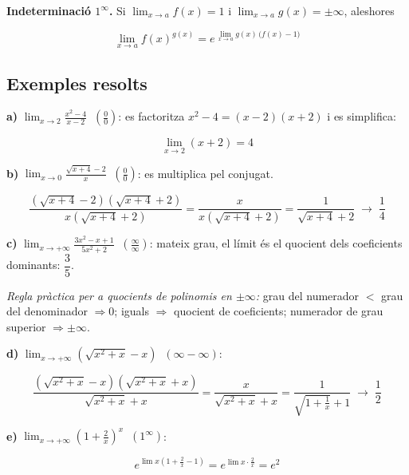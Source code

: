 \textbf{Indeterminació $1^\infty$.} Si $\displaystyle\lim_{x\to a} f(x)=1$ i $\displaystyle\lim_{x\to a} g(x)=\pm\infty$, aleshores

\begin{equation*}
\lim_{x\to a} f(x)^{g(x)} = e^{\,\lim_{x\to a} g(x)\,\bigl(f(x)-1\bigr)}
\end{equation*}

\subsection{Exemples resolts}

\textbf{a)} $\displaystyle\lim_{x\to2}\frac{x^2-4}{x-2}\;\;\left(\tfrac00\right)$: es factoritza $x^2-4=(x-2)(x+2)$ i es simplifica:

\begin{equation*}
\lim_{x\to2}(x+2)=4
\end{equation*}

\textbf{b)} $\displaystyle\lim_{x\to0}\frac{\sqrt{x+4}-2}{x}\;\;\left(\tfrac00\right)$: es multiplica pel conjugat.

\begin{equation*}
\frac{(\sqrt{x+4}-2)(\sqrt{x+4}+2)}{x(\sqrt{x+4}+2)}=\frac{x}{x(\sqrt{x+4}+2)}=\frac{1}{\sqrt{x+4}+2}\;\longrightarrow\;\frac14
\end{equation*}

\textbf{c)} $\displaystyle\lim_{x\to+\infty}\frac{3x^2-x+1}{5x^2+2}\;\;\left(\tfrac\infty\infty\right)$: mateix grau, el límit és el quocient dels coeficients dominants: $\dfrac35$.

\emph{Regla pràctica per a quocients de polinomis en $\pm\infty$:} grau del numerador $<$ grau del denominador $\Rightarrow 0$; iguals $\Rightarrow$ quocient de coeficients; numerador de grau superior $\Rightarrow\pm\infty$.

\textbf{d)} $\displaystyle\lim_{x\to+\infty}\left(\sqrt{x^2+x}-x\right)\;\;(\infty-\infty)$:

\begin{equation*}
\frac{(\sqrt{x^2+x}-x)(\sqrt{x^2+x}+x)}{\sqrt{x^2+x}+x}=\frac{x}{\sqrt{x^2+x}+x}=\frac{1}{\sqrt{1+\frac1x}+1}\;\longrightarrow\;\frac12
\end{equation*}

\textbf{e)} $\displaystyle\lim_{x\to+\infty}\left(1+\frac2x\right)^{x}\;\;(1^\infty)$:

\begin{equation*}
e^{\lim x\left(1+\frac2x-1\right)}=e^{\lim x\cdot\frac2x}=e^2
\end{equation*}


